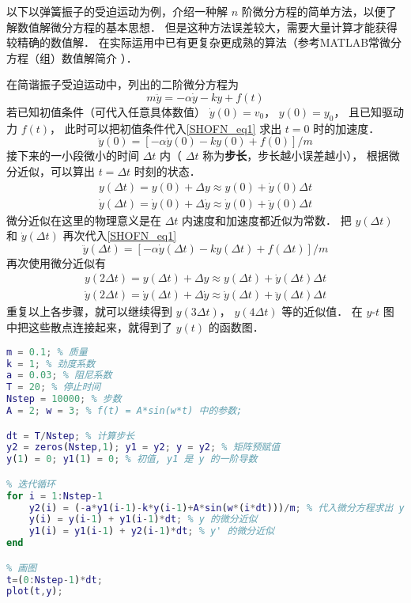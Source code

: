 

以下以弹簧振子的受迫运动为例，介绍一种解 $n$ 阶微分方程的简单方法，以便了解数值解微分方程的基本思想． 但是这种方法误差较大，需要大量计算才能获得较精确的数值解． 在实际运用中已有更复杂更成熟的算法（参考MATLAB常微分方程（组）数值解简介%
）．

在简谐振子受迫运动中，列出的二阶微分方程为
\begin{equation}\label{SHOFN_eq1}
m\ddot y = -\alpha \dot y - ky + f(t)
\end{equation}
若已知初值条件（可代入任意具体数值） $\dot y(0) = v_0$，  $y(0) = y_0$， 且已知驱动力 $f(t)$， 此时可以把初值条件代入\autoref{SHOFN_eq1} 求出 $t = 0$ 时的加速度．
\begin{equation}
\ddot y(0) = [- \alpha \dot y(0) - ky(0) + f(0)]/m
\end{equation}
接下来的一小段微小的时间 $\Delta t$ 内（ $\Delta t$ 称为\textbf{步长}，步长越小误差越小）， 根据微分近似，可以算出 $t = \Delta t$ 时刻的状态．
\begin{gather}
y(\Delta t) =  y(0) + \Delta y \approx y(0) + \dot y(0) \Delta t\\
\dot y(\Delta t) = \dot y(0) + \Delta \dot y \approx \dot y(0) + \ddot y(0) \Delta t
\end{gather}
微分近似在这里的物理意义是在 $\Delta t$ 内速度和加速度都近似为常数． 把 $y(\Delta t)$ 和 $\dot y(\Delta t)$ 再次代入\autoref{SHOFN_eq1}
\begin{equation}
\ddot y(\Delta t) = [- \alpha \dot y(\Delta t) - ky(\Delta t) + f(\Delta t)]/m
\end{equation}
再次使用微分近似有
\begin{gather}
y(2\Delta t) =  y(\Delta t) + \Delta y \approx y(\Delta t) + \dot y(\Delta t) \Delta t\\
\dot y(2\Delta t) = \dot y(\Delta t) + \Delta \dot y \approx \dot y(\Delta t) + \ddot y(\Delta t) \Delta t
\end{gather}
重复以上各步骤，就可以继续得到 $y(3\Delta t)$，  $y(4\Delta t)$ 等的近似值． 在 $y$-$t$ 图中把这些散点连接起来，就得到了 $y(t)$ 的函数图．

\begin{lstlisting}[language=matlab, caption=SHOf.m]
% 参数设定
m = 0.1; % 质量
k = 1; % 劲度系数
a = 0.03; % 阻尼系数
T = 20; % 停止时间
Nstep = 10000; % 步数
A = 2; w = 3; % f(t) = A*sin(w*t) 中的参数;

dt = T/Nstep; % 计算步长
y2 = zeros(Nstep,1); y1 = y2; y = y2; % 矩阵预赋值
y(1) = 0; y1(1) = 0; % 初值, y1 是 y 的一阶导数

% 迭代循环
for i = 1:Nstep-1
    y2(i) = (-a*y1(i-1)-k*y(i-1)+A*sin(w*(i*dt)))/m; % 代入微分方程求出 y''.
    y(i) = y(i-1) + y1(i-1)*dt; % y 的微分近似
    y1(i) = y1(i-1) + y2(i-1)*dt; % y' 的微分近似
end

% 画图
t=(0:Nstep-1)*dt;
plot(t,y);
\end{lstlisting}

